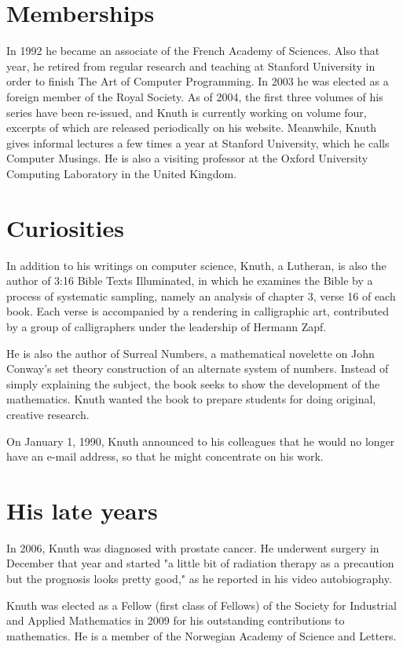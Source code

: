 \documentclass[a4paper,11pt]{article}
\begin{document}
\section{Memberships}
In 1992 he became an associate of the French Academy of Sciences. Also
 that year, he retired from regular research and teaching at Stanford 
University in order to finish The Art of Computer Programming. In 2003 
he was elected as a foreign member of the Royal Society. As of 2004, 
the first three volumes of his series have been re-issued, and Knuth is 
currently working on volume four, excerpts of which are released periodically 
on his website. Meanwhile, Knuth gives informal lectures a few times a 
year at Stanford University, which he calls Computer Musings. He is also a 
visiting professor at the Oxford University Computing Laboratory in the 
United Kingdom.


\section{Curiosities}
In addition to his writings on computer science, Knuth, a Lutheran, 
is also the author of 3:16 Bible Texts Illuminated, in which he 
examines the Bible by a process of systematic sampling, namely an 
analysis of chapter 3, verse 16 of each book. Each verse is accompanied 
by a rendering in calligraphic art, contributed by a group of calligraphers 
under the leadership of Hermann Zapf.

He is also the author of Surreal Numbers, a mathematical novelette 
on John Conway's set theory construction of an alternate system of 
numbers. Instead of simply explaining the subject, the book seeks to 
show the development of the mathematics. Knuth wanted the book to 
prepare students for doing original, creative research.

On January 1, 1990, Knuth announced to his colleagues that he would 
no longer have an e-mail address, so that he might concentrate on his work.

\section{His late years}
In 2006, Knuth was diagnosed with prostate cancer. He underwent surgery 
in December that year and started "a little bit of radiation therapy  
as a precaution but the prognosis looks pretty good," as he reported 
in his video autobiography.

Knuth was elected as a Fellow (first class of Fellows) of the Society 
for Industrial and Applied Mathematics in 2009 for his outstanding 
contributions to mathematics. He is a member of the Norwegian 
Academy of Science and Letters.
\end{document}
